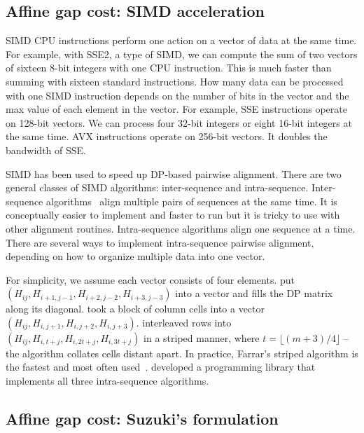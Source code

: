 \documentclass{bioinfo}
\begin{document}
\begin{methods}
\subsection{Affine gap cost: SIMD acceleration}

SIMD CPU instructions perform one action on a vector of data at the same time.
For example, with SSE2, a type of SIMD, we can compute the sum of two vectors
of sixteen 8-bit integers with one CPU instruction. This is much faster than
summing with sixteen standard instructions. How many data can be processed with
one SIMD instruction depends on the number of bits in the vector and the max
value of each element in the vector. For example, SSE instructions operate on
128-bit vectors. We can process four 32-bit integers or eight 16-bit integers
at the same time. AVX instructions operate on 256-bit vectors. It doubles the
bandwidth of SSE.

SIMD has been used to speed up DP-based pairwise alignment. There are two
general classes of SIMD algorithms: inter-sequence and intra-sequence.
Inter-sequence algorithms~\citep{Rognes:2011aa} align multiple pairs of
sequences at the same time. It is conceptually easier to implement and faster
to run but it is tricky to use with other alignment routines. Intra-sequence
algorithms align one sequence at a time. There are several ways to implement
intra-sequence pairwise alignment, depending on how to organize multiple data
into one vector.

For simplicity, we assume each vector consists of four elements.
\citet{Wozniak:1997aa} put $(H_{ij},H_{i+1,j-1},H_{i+2,j-2},H_{i+3,j-3})$
into a vector and fills the DP matrix along its diagonal.
\citet{Rognes:2000aa} took a block of column cells into a vector
$(H_{ij},H_{i,j+1},H_{i,j+2},H_{i,j+3})$. \citet{Farrar:2007hs} interleaved rows
into $(H_{ij},H_{i,t+j},H_{i,2t+j},H_{i,3t+j})$ in a striped manner, where
$t=\lfloor(m+3)/4\rfloor$ -- the algorithm collates cells distant apart. In
practice, Farrar's striped algorithm is the fastest and most often
used~\citep{Szalkowski:2008aa,Zhao:2013aa}. \citet{Daily:2016aa} developed a
programming library that implements all three intra-sequence algorithms.

\subsection{Affine gap cost: Suzuki's formulation}


\end{methods}
\end{document}
